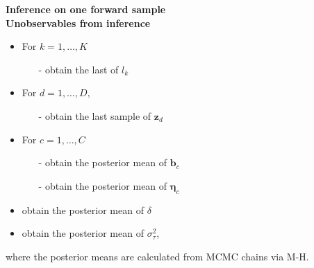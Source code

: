 \documentclass[a4paper]{article}
\begin{document}
\begin{algorithm}[H]
                  	\textbf{Inference on one forward sample}\\
                  	\vspace{4mm}              	             
                  	\textbf{Unobservables from inference}
                  	\begin{itemize}
                  		\item For $k=1,\ldots, K$
                  		\begin{itemize}
                  			\item[-] obtain the last of $l_k$
                  		\end{itemize}
                  		\item For $d=1,\ldots, D,$
                  		\begin{itemize}
                  			\item[-] obtain the last sample of $\boldsymbol{z}_d$ 
                  		\end{itemize}
                  		\item For $c=1,\ldots, C$
                  		\begin{itemize}
                  			\item[-] obtain the posterior mean of $\boldsymbol{b}_c$ 
                  			\item[-] obtain the posterior mean of $\boldsymbol{\eta}_c$ 
                  		\end{itemize}
                  		\item obtain the posterior mean of $\delta$ 
                  		\item  obtain the posterior mean of $\sigma_\tau^2$,
                  	\end{itemize}
                  		where the posterior means are calculated from MCMC chains via M-H. \\
                  		

\end{algorithm}
\end{document}
